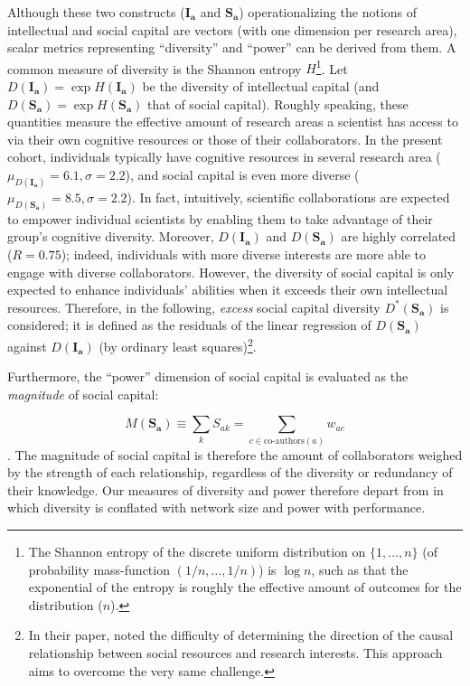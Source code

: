 \documentclass{article}
\begin{document}
Although these two constructs ($\bm{I_a}$ and $\bm{S_a}$) operationalizing the notions of intellectual and social capital are vectors (with one dimension per research area), scalar metrics representing ``diversity'' and ``power'' can be derived from them. A common measure of diversity is the Shannon entropy $H$\footnote{The Shannon entropy of the discrete uniform distribution on $\{1,\dots,n\}$ (of probability mass-function $(1/n,\dots,1/n)$) is $\log{n}$, such as that the exponential of the entropy is roughly the effective amount of outcomes for the distribution ($n$).}. Let 
 $D(\bm{I_a})=\exp{H(\bm{I_a})}$ be the diversity of intellectual capital (and $D(\bm{S_a})=\exp{H(\bm{S_a})}$ that of social capital). Roughly speaking, these quantities measure the effective amount of research areas a scientist has access to via their own cognitive resources or those of their collaborators. In the present cohort,  individuals typically have cognitive resources in several research area ($\mu_{D(\bm{I_a})}=6.1,\sigma=2.2$), and social capital is even more diverse ($\mu_{D(\bm{S_a})}=8.5,\sigma=2.2$). In fact, intuitively,  scientific collaborations are expected to empower individual scientists by enabling them to take advantage of their group's cognitive diversity. Moreover, $D(\bm{I_a})$ and $D(\bm{S_a})$ are highly correlated ($R=0.75$); indeed, individuals with more diverse interests are more able to engage with diverse collaborators. However, the diversity of social capital is only expected to enhance individuals' abilities when it exceeds their own intellectual resources. Therefore, in the following, \textit{excess} social capital diversity $D^{\ast}(\bm{S_a})$ is considered; it is defined as the residuals of the linear regression of $D(\bm{S_a})$ against $D(\bm{I_a})$ (by ordinary least squares)\footnote{In their paper, \citet{Tripodi2020} noted the difficulty of determining the direction of the causal relationship between social resources and research interests. This approach aims to overcome the very same challenge.}.

Furthermore, the ``power'' dimension of social capital is evaluated as the \textit{magnitude} of social capital:

\begin{equation}
    M(\bm{S_a})\equiv \sum_k S_{ak} = \sum_{c \in \text{co-authors}(a)} w_{ac}
\end{equation}. The magnitude of social capital is therefore the amount of collaborators weighed by the strength of each relationship, regardless of the diversity or redundancy of their knowledge. Our measures of diversity and power therefore depart from \citealt{Abbasi2014} in which diversity is conflated with network size and power with performance. %
\end{document}
